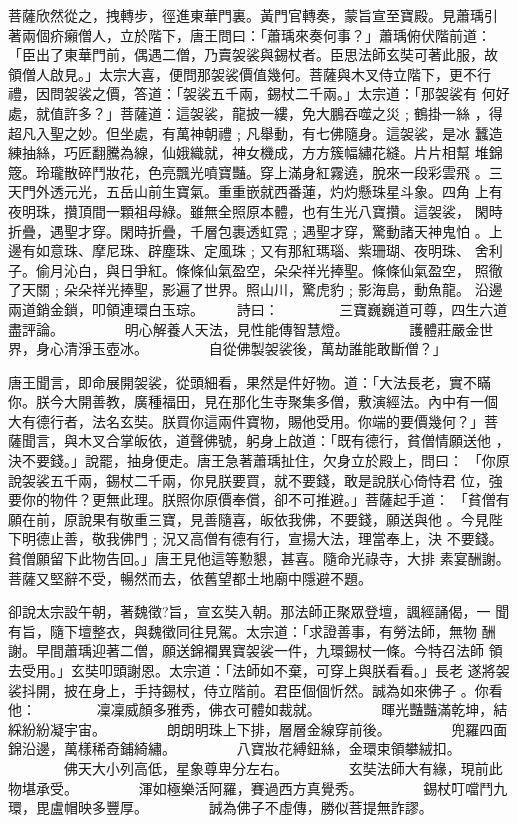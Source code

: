 \begin{pinyinscope}
{菩薩欣然從之，拽轉步，徑進東華門裏。黃門官轉奏，蒙旨宣至寶殿。見蕭瑀引
著兩個疥癩僧人，立於階下，唐王問曰：「蕭瑀來奏何事？」蕭瑀俯伏階前道：
「臣出了東華門前，偶遇二僧，乃賣袈裟與錫杖者。臣思法師玄奘可著此服，故
領僧人啟見。」太宗大喜，便問那袈裟價值幾何。菩薩與木叉侍立階下，更不行
禮，因問袈裟之價，答道：「袈裟五千兩，錫杖二千兩。」太宗道：「那袈裟有
何好處，就值許多？」菩薩道：這袈裟，龍披一縷，免大鵬吞噬之災﹔鶴掛一絲
，得超凡入聖之妙。但坐處，有萬神朝禮﹔凡舉動，有七佛隨身。這袈裟，是冰
蠶造練抽絲，巧匠翻騰為線，仙娥織就，神女機成，方方簇幅繡花縫。片片相幫
堆錦簆。玲瓏散碎鬥妝花，色亮飄光噴寶豔。穿上滿身紅霧遶，脫來一段彩雲飛
。三天門外透元光，五岳山前生寶氣。重重嵌就西番蓮，灼灼懸珠星斗象。四角
上有夜明珠，攢頂間一顆祖母綠。雖無全照原本體，也有生光八寶攢。這袈裟，
閑時折疊，遇聖才穿。閑時折疊，千層包裹透虹霓﹔遇聖才穿，驚動諸天神鬼怕
。上邊有如意珠、摩尼珠、辟塵珠、定風珠﹔又有那紅瑪瑙、紫珊瑚、夜明珠、
舍利子。偷月沁白，與日爭紅。條條仙氣盈空，朵朵祥光捧聖。條條仙氣盈空，
照徹了天關﹔朵朵祥光捧聖，影遍了世界。照山川，驚虎豹﹔影海島，動魚龍。
沿邊兩道銷金鎖，叩領連環白玉琮。
　　詩曰：
　　　　三寶巍巍道可尊，四生六道盡評論。
　　　　明心解養人天法，見性能傳智慧燈。
　　　　護體莊嚴金世界，身心清淨玉壺冰。
　　　　自從佛製袈裟後，萬劫誰能敢斷僧？」

唐王聞言，即命展開袈裟，從頭細看，果然是件好物。道：「大法長老，實不瞞
你。朕今大開善教，廣種福田，見在那化生寺聚集多僧，敷演經法。內中有一個
大有德行者，法名玄奘。朕買你這兩件寶物，賜他受用。你端的要價幾何？」菩
薩聞言，與木叉合掌皈依，道聲佛號，躬身上啟道：「既有德行，貧僧情願送他
，決不要錢。」說罷，抽身便走。唐王急著蕭瑀扯住，欠身立於殿上，問曰：
「你原說袈裟五千兩，錫杖二千兩，你見朕要買，就不要錢，敢是說朕心倚恃君
位，強要你的物件？更無此理。朕照你原價奉償，卻不可推避。」菩薩起手道：
「貧僧有願在前，原說果有敬重三寶，見善隨喜，皈依我佛，不要錢，願送與他
。今見陛下明德止善，敬我佛門﹔況又高僧有德有行，宣揚大法，理當奉上，決
不要錢。貧僧願留下此物告回。」唐王見他這等懃懇，甚喜。隨命光祿寺，大排
素宴酬謝。菩薩又堅辭不受，暢然而去，依舊望都土地廟中隱避不題。

卻說太宗設午朝，著魏徵?旨，宣玄奘入朝。那法師正聚眾登壇，諷經誦偈，一
聞有旨，隨下壇整衣，與魏徵同往見駕。太宗道：「求證善事，有勞法師，無物
酬謝。早間蕭瑀迎著二僧，願送錦襴異寶袈裟一件，九環錫杖一條。今特召法師
領去受用。」玄奘叩頭謝恩。太宗道：「法師如不棄，可穿上與朕看看。」長老
遂將袈裟抖開，披在身上，手持錫杖，侍立階前。君臣個個忻然。誠為如來佛子
。你看他：
　　　　凜凜威顏多雅秀，佛衣可體如裁就。
　　　　暉光豔豔滿乾坤，結綵紛紛凝宇宙。
　　　　朗朗明珠上下排，層層金線穿前後。
　　　　兜羅四面錦沿邊，萬樣稀奇鋪綺繡。
　　　　八寶妝花縛鈕絲，金環束領攀絨扣。
　　　　佛天大小列高低，星象尊卑分左右。
　　　　玄奘法師大有緣，現前此物堪承受。
　　　　渾如極樂活阿羅，賽過西方真覺秀。
　　　　錫杖叮噹鬥九環，毘盧帽映多豐厚。
　　　　誠為佛子不虛傳，勝似菩提無詐謬。

}
\end{pinyinscope}
